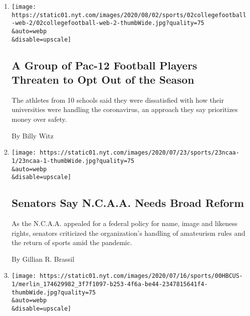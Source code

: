 \begin{enumerate}
\def\labelenumi{\arabic{enumi}.}
\item
  \href{/2020/08/02/sports/ncaafootball/coronavirus-college-football-pac-12.html}{}

  \texttt{[image: https://static01.nyt.com/images/2020/08/02/sports/02collegefootball-web-2/02collegefootball-web-2-thumbWide.jpg?quality=75\\\&auto=webp\\\&disable=upscale]}

  \hypertarget{a-group-of-pac-12-football-players-threaten-to-opt-out-of-the-season}{%
  \subsection{A Group of Pac-12 Football Players Threaten to Opt Out of
  the
  Season}\label{a-group-of-pac-12-football-players-threaten-to-opt-out-of-the-season}}

  The athletes from 10 schools said they were dissatisfied with how
  their universities were handling the coronavirus, an approach they say
  prioritizes money over safety.

  By Billy Witz
\item
  \href{/2020/07/23/sports/ncaa-NIL-rights.html}{}

  \texttt{[image: https://static01.nyt.com/images/2020/07/23/sports/23ncaa-1/23ncaa-1-thumbWide.jpg?quality=75\\\&auto=webp\\\&disable=upscale]}

  \hypertarget{senators-say-ncaa-needs-broad-reform}{%
  \subsection{Senators Say N.C.A.A. Needs Broad
  Reform}\label{senators-say-ncaa-needs-broad-reform}}

  As the N.C.A.A. appealed for a federal policy for name, image and
  likeness rights, senators criticized the organization's handling of
  amateurism rules and the return of sports amid the pandemic.

  By Gillian R. Brassil
\item
  \href{/2020/07/22/sports/ncaabasketball/black-lives-matter-hbcus-college-athletes.html}{}

  \texttt{[image: https://static01.nyt.com/images/2020/07/16/sports/00HBCUS-1/merlin\_174629982\_3f7f1097-b253-4f6a-be44-2347815641f4-thumbWide.jpg?quality=75\\\&auto=webp\\\&disable=upscale]}

  \hypertarget{black-lives-matter-protests-spawn-push-for-athletes-to-attend-historically-black-colleges}{%
}
\end{enumerate}
